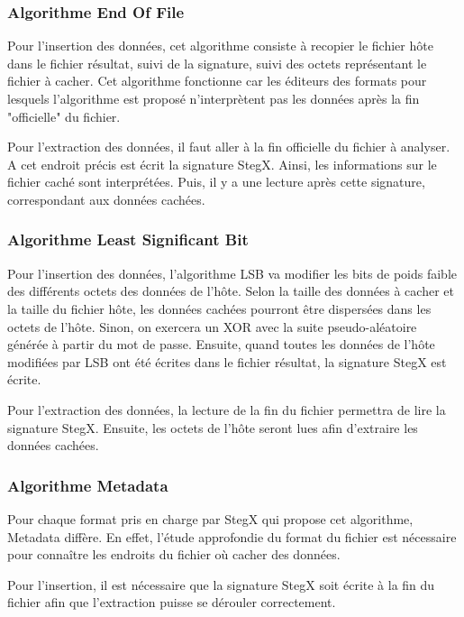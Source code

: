 \documentclass[11pt]{article}
\begin{document}

\subsubsection{Algorithme End Of File}

Pour l'insertion des données, cet algorithme consiste à recopier le fichier 
hôte dans le fichier résultat, suivi de la signature, suivi des octets 
représentant le fichier à cacher. Cet algorithme fonctionne car les éditeurs 
des formats pour lesquels l'algorithme est proposé n'interprètent pas les données 
après la fin "officielle" du fichier. 

Pour l'extraction des données, il faut aller à la fin officielle du fichier 
à analyser. A cet endroit précis est écrit la signature StegX. Ainsi, 
les informations sur le fichier caché sont interprétées. Puis, il y a une 
lecture après cette signature, correspondant aux données cachées. 

\subsubsection{Algorithme Least Significant Bit}

Pour l'insertion des données, l'algorithme LSB va modifier les bits de 
poids faible des différents octets des données de l'hôte. Selon la taille des
données à cacher et la taille du fichier hôte, les données cachées pourront 
être dispersées dans les octets de l'hôte. Sinon, on exercera un XOR avec 
la suite pseudo-aléatoire générée à partir du mot de passe. 
Ensuite, quand toutes les données de l'hôte modifiées par LSB ont été écrites 
dans le fichier résultat, la signature StegX est écrite. 

Pour l'extraction des données, la lecture de la fin du fichier permettra de 
lire la signature StegX. Ensuite, les octets de l'hôte seront lues afin d'extraire 
les données cachées. 

\subsubsection{Algorithme Metadata}

Pour chaque format pris en charge par StegX qui propose cet algorithme, 
Metadata diffère. En effet, l'étude approfondie du format du fichier est 
nécessaire pour connaître les endroits du fichier où cacher des données. 

Pour l'insertion, il est nécessaire que la signature StegX soit écrite à 
la fin du fichier afin que l'extraction puisse se dérouler correctement. 
\end{document}

